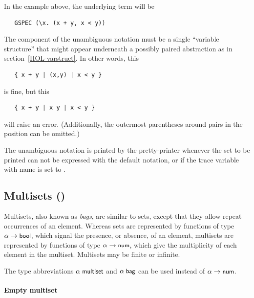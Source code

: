 {In the example above, the underlying  term will be
\begin{hol}
\begin{verbatim}
   GSPEC (\x. (x + y, x < y))
\end{verbatim}
\end{hol}

The  component of the unambiguous notation must be a single
``variable structure'' that might appear underneath a possibly paired
abstraction as in section~\ref{HOL-varstruct}.  In other words, this
\begin{hol}
\begin{verbatim}
   { x + y | (x,y) | x < y }
\end{verbatim}
\end{hol}
is fine, but this
\begin{hol}
\begin{verbatim}
   { x + y | x y | x < y }
\end{verbatim}
\end{hol}
will raise an error.  (Additionally, the outermost parentheses around
pairs in the  position can be omitted.)

The unambiguous notation is printed by the pretty-printer whenever the
set to be printed can not be expressed with the default notation, or
if the trace variable with name 
is set to .


\subsection{Multisets ()}\label{multiset}

Multisets, also known as \emph{bags}, are similar to sets, except that
they allow repeat occurrences of an element. Whereas sets are
represented by functions of type $\alpha\to\mbox{\small{\textbf{\sf{bool}}}}$, which signal
the presence, or absence, of an element, multisets are represented
by functions of type $\alpha\to\mbox{\small{\textbf{\sf{num}}}}$, which give the
multiplicity of each element in the multiset. Multisets may be finite
or infinite.

The type abbreviations $\alpha\;\mbox{\small{\textbf{\sf{multiset}}}}$ and
$\alpha\;\mbox{\small{\textbf{\sf{bag}}}}$ can be used instead of $\alpha\to\mbox{\small{\textbf{\sf{num}}}}$.

\paragraph {Empty multiset}

}
